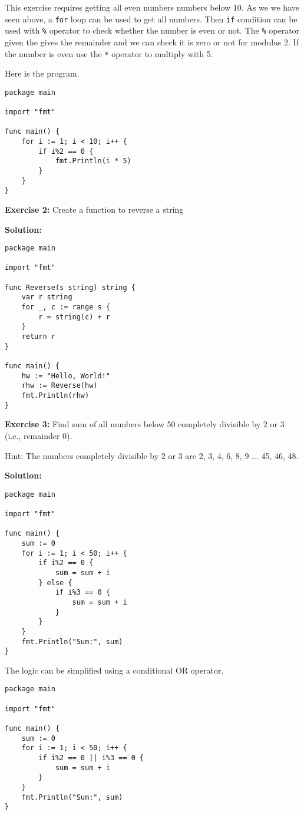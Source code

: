 This exercise requires getting all even numbers numbers below 10.  As
we we have seen above, a \texttt{for} loop can be used to get all
numbers.  Then \texttt{if} condition can be used with \texttt{\%}
operator to check whether the number is even or not.  The \texttt{\%}
operator given the gives the remainder and we can check it is zero or
not for modulus 2.  If the number is even use the \texttt{*} operator
to multiply with 5.

Here is the program.

\begin{lstlisting}[numbers=none]
package main

import "fmt"

func main() {
    for i := 1; i < 10; i++ {
        if i%2 == 0 {
            fmt.Println(i * 5)
        }
    }
}
\end{lstlisting}

\textbf{Exercise 2:} Create a function to reverse a string

\textbf{Solution:}

\begin{lstlisting}[numbers=none]
package main

import "fmt"

func Reverse(s string) string {
    var r string
    for _, c := range s {
        r = string(c) + r
    }
    return r
}

func main() {
    hw := "Hello, World!"
    rhw := Reverse(hw)
    fmt.Println(rhw)
}
\end{lstlisting}

\textbf{Exercise 3:} Find sum of all numbers below 50 completely divisible
by 2 or 3 (i.e., remainder 0).

Hint: The numbers completely divisible by 2 or 3 are 2, 3, 4, 6, 8, 9 ... 45,
46, 48.

\textbf{Solution:}

\begin{lstlisting}[numbers=none]
package main

import "fmt"

func main() {
    sum := 0
    for i := 1; i < 50; i++ {
        if i%2 == 0 {
            sum = sum + i
        } else {
            if i%3 == 0 {
                sum = sum + i
            }
        }
    }
    fmt.Println("Sum:", sum)
}
\end{lstlisting}

The logic can be simplified using a conditional OR operator.

\begin{lstlisting}[numbers=none]
package main

import "fmt"

func main() {
    sum := 0
    for i := 1; i < 50; i++ {
        if i%2 == 0 || i%3 == 0 {
            sum = sum + i
        }
    }
    fmt.Println("Sum:", sum)
}
\end{lstlisting}

